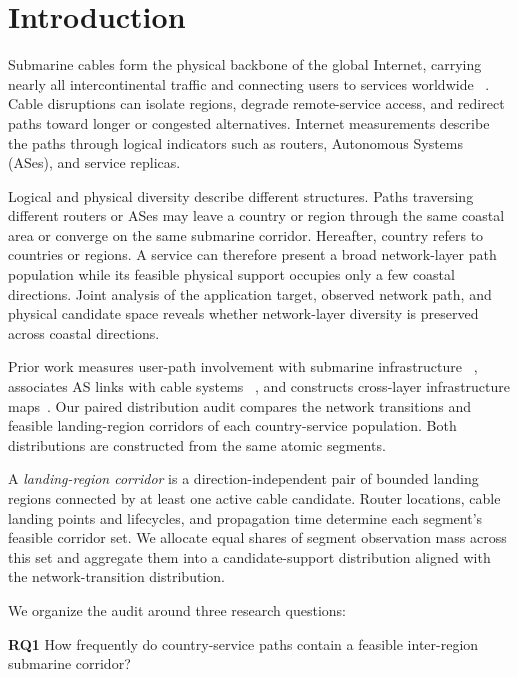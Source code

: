 \section{Introduction}
\label{sec:introduction}

Submarine cables form the physical backbone of the global Internet, carrying
nearly all intercontinental traffic and connecting users to services worldwide
~\cite{telegeography_submarine_map}. Cable disruptions can isolate regions,
degrade remote-service access, and redirect paths toward longer or congested
alternatives. Internet measurements describe the paths through logical
indicators such as routers, Autonomous Systems (ASes), and service replicas.

Logical and physical diversity describe different structures. Paths traversing
different routers or ASes may leave a country or region through the same
coastal area or converge on the same submarine corridor. Hereafter, country
refers to countries or regions. A service can therefore present a broad
network-layer path population while its feasible physical support occupies
only a few coastal directions. Joint analysis of the application target,
observed network path, and physical candidate space reveals whether
network-layer diversity is preserved across coastal directions.

Prior work measures user-path involvement with submarine infrastructure
~\cite{liu2020outofsight}, associates AS links with cable systems
~\cite{ye2023impact,ramanathan2023nautilus,wang2025calypso}, and constructs
cross-layer infrastructure maps~\cite{durairajan2013atlas,anderson2022igdb}.
Our paired distribution audit compares the network transitions and feasible
landing-region corridors of each country-service population. Both
distributions are constructed from the same atomic segments.

A \emph{landing-region corridor} is a direction-independent pair of bounded
landing regions connected by at least one active cable candidate. Router
locations, cable landing points and lifecycles, and propagation time determine
each segment's feasible corridor set. We allocate equal shares of segment
observation mass across this set and aggregate them into a candidate-support
distribution aligned with the network-transition distribution.

We organize the audit around three research questions:

\textbf{RQ1} How frequently do country-service paths contain a feasible inter-region submarine corridor?

